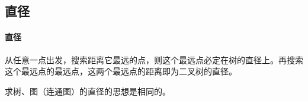 \subsection{直径}
	\paragraph{直径} 从任意一点出发，搜索距离它最远的点，则这个最远点必定在树的直径上。再搜索这个最远点的最远点，这两个最远点的距离即为二叉树的直径。
	
	求树、图（连通图）的直径的思想是相同的。

	